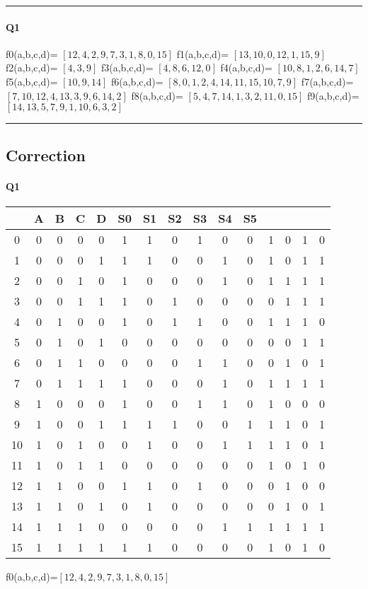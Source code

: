 \hrule width 1\linewidth
\paragraph{Q1}


f0(a,b,c,d)= $[12, 4, 2, 9, 7, 3, 1, 8, 0, 15]$
f1(a,b,c,d)= $[13, 10, 0, 12, 1, 15, 9]$
f2(a,b,c,d)= $[4, 3, 9]$
f3(a,b,c,d)= $[4, 8, 6, 12, 0]$
f4(a,b,c,d)= $[10, 8, 1, 2, 6, 14, 7]$
f5(a,b,c,d)= $[10, 9, 14]$
f6(a,b,c,d)= $[8, 0, 1, 2, 4, 14, 11, 15, 10, 7, 9]$
f7(a,b,c,d)= $[7, 10, 12, 4, 13, 3, 9, 6, 14, 2]$
f8(a,b,c,d)= $[5, 4, 7, 14, 1, 3, 2, 11, 0, 15]$
f9(a,b,c,d)= $[14, 13, 5, 7, 9, 1, 10, 6, 3, 2]$

\hrule width 1\linewidth\pagebreak
\subsection{Correction}

\paragraph{Q1}

        \begin{tabular}{|c|c|c|c|c||c|c|c|c|c|c|c|c|c|c|}
    \toprule
         & A & B & C & D & S0 & S1 & S2 & S3 & S4 & S5\\ \midrule0 & 0 & 0 & 0 & 0 & 1 & 1 & 0 & 1 & 0 & 0 & 1 & 0 & 1 & 0\\1 & 0 & 0 & 0 & 1 & 1 & 1 & 0 & 0 & 1 & 0 & 1 & 0 & 1 & 1\\2 & 0 & 0 & 1 & 0 & 1 & 0 & 0 & 0 & 1 & 0 & 1 & 1 & 1 & 1\\3 & 0 & 0 & 1 & 1 & 1 & 0 & 1 & 0 & 0 & 0 & 0 & 1 & 1 & 1\\\midrule4 & 0 & 1 & 0 & 0 & 1 & 0 & 1 & 1 & 0 & 0 & 1 & 1 & 1 & 0\\5 & 0 & 1 & 0 & 1 & 0 & 0 & 0 & 0 & 0 & 0 & 0 & 0 & 1 & 1\\6 & 0 & 1 & 1 & 0 & 0 & 0 & 0 & 1 & 1 & 0 & 0 & 1 & 0 & 1\\7 & 0 & 1 & 1 & 1 & 1 & 0 & 0 & 0 & 1 & 0 & 1 & 1 & 1 & 1\\\midrule8 & 1 & 0 & 0 & 0 & 1 & 0 & 0 & 1 & 1 & 0 & 1 & 0 & 0 & 0\\9 & 1 & 0 & 0 & 1 & 1 & 1 & 1 & 0 & 0 & 1 & 1 & 1 & 0 & 1\\10 & 1 & 0 & 1 & 0 & 0 & 1 & 0 & 0 & 1 & 1 & 1 & 1 & 0 & 1\\11 & 1 & 0 & 1 & 1 & 0 & 0 & 0 & 0 & 0 & 0 & 1 & 0 & 1 & 0\\\midrule12 & 1 & 1 & 0 & 0 & 1 & 1 & 0 & 1 & 0 & 0 & 0 & 1 & 0 & 0\\13 & 1 & 1 & 0 & 1 & 0 & 1 & 0 & 0 & 0 & 0 & 0 & 1 & 0 & 1\\14 & 1 & 1 & 1 & 0 & 0 & 0 & 0 & 0 & 1 & 1 & 1 & 1 & 1 & 1\\15 & 1 & 1 & 1 & 1 & 1 & 1 & 0 & 0 & 0 & 0 & 1 & 0 & 1 & 0\\\bottomrule
        \end{tabular}
        f0(a,b,c,d)=$[12, 4, 2, 9, 7, 3, 1, 8, 0, 15]$

